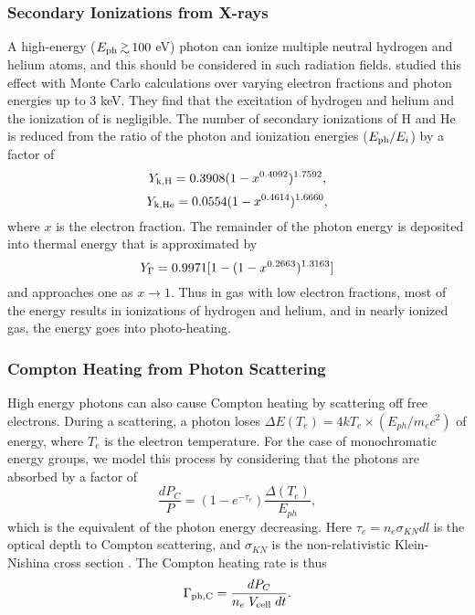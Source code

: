\documentclass[apj,onecolumn]{emulateapj}
\begin{document}
\subsubsection{Secondary Ionizations from X-rays}
\label{sec:xrays}

A high-energy ($E_{\rm ph} \gsim 100$ eV) photon can ionize multiple
neutral hydrogen and helium atoms, and this should be considered in
such radiation fields.  \citet{Shull85} studied this effect with Monte
Carlo calculations over varying electron fractions and photon energies
up to 3 keV.  They find that the excitation of hydrogen and helium and
the ionization of  is negligible.  The number of secondary
ionizations of H and He is reduced from the ratio of the photon and
ionization energies ($E_{\rm ph} / E_i$) by a factor of
%
\begin{equation}
  Y_{\rm k,H} = 0.3908 (1 - x^{0.4092})^{1.7592},
\end{equation}
\begin{equation}
  Y_{\rm k,He} = 0.0554 (1 - x^{0.4614})^{1.6660},
\end{equation}
where $x$ is the electron fraction.  The remainder of the photon
energy is deposited into thermal energy that is approximated by
%
\begin{equation}
  Y_{\rm \Gamma} = 0.9971 [ 1 - (1 - x^{0.2663})^{1.3163} ]
\end{equation}
and approaches one as $x \rightarrow 1$.  Thus in gas with low
electron fractions, most of the energy results in ionizations of
hydrogen and helium, and in nearly ionized gas, the energy goes into
photo-heating.

\subsubsection{Compton Heating from Photon Scattering}

High energy photons can also cause Compton heating by scattering off
free electrons.  During a scattering, a photon loses $\Delta E(T_e) =
4kT_e \times (E_{ph} / m_e c^2)$ of energy, where $T_e$ is the
electron temperature.  For the case of monochromatic energy groups, we
model this process by considering that the photons are absorbed by a
factor of 
\begin{equation}
  \frac{dP_C}{P} = (1 - e^{-\tau_e}) \frac{\Delta(T_e)}{E_{ph}},
\end{equation}
which is the equivalent of the photon energy decreasing.  Here $\tau_e
= n_e \sigma_{KN} dl$ is the optical depth to Compton scattering, and
$\sigma_{KN}$ is the non-relativistic Klein-Nishina cross section
\citep{Rybicki}.  The Compton heating rate is thus
\begin{equation}
  \Gamma_{\rm ph,C} = \frac{dP_C}{n_e \; V_{\rm cell} \; dt}.
\end{equation}
\end{document}
